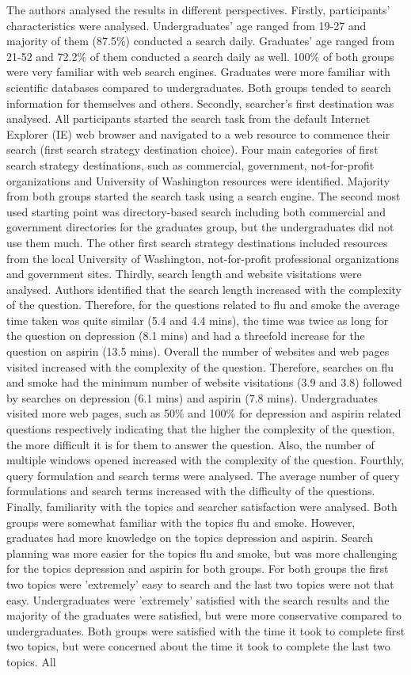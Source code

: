 \documentclass[]{article}
\begin{document}
The authors analysed the results in different perspectives. Firstly, participants' characteristics were analysed. Undergraduates' age ranged from 19-27 and majority of them (87.5\%) conducted a search daily. Graduates' age ranged from 21-52 and 72.2\% of them conducted a search daily as well. 100\% of both groups were very familiar with web search engines. Graduates were more familiar with scientific databases compared to undergraduates. Both groups tended to search information for themselves and others. Secondly, searcher's first destination was analysed. All participants started the search task from the default Internet Explorer (IE) web browser and navigated to a web resource to commence their search (first search strategy destination choice). Four main categories of first search strategy destinations, such as commercial, government, not-for-profit organizations and University of Washington resources were identified. Majority from both groups started the search task using a search engine. The second most used starting point was directory-based search including both commercial and government directories for the graduates group, but the undergraduates did not use them much. The other first search strategy destinations included resources from the local University of Washington, not-for-profit professional organizations and government sites. Thirdly, search length and website visitations were analysed. Authors identified that the search length increased with the complexity of the question. Therefore, for the questions related to flu and smoke the average time taken was quite similar (5.4 and 4.4 mins), the time was twice as long for the question on depression (8.1 mins) and had a threefold increase for the question on aspirin (13.5 mins). Overall the number of websites and web pages visited increased with the complexity of the question. Therefore, searches on flu and smoke had the minimum number of website visitations (3.9 and 3.8) followed by searches on depression (6.1 mins) and aspirin (7.8 mins). Undergraduates visited more web pages, such as 50\% and 100\% for depression and aspirin related questions respectively indicating that the higher the complexity of the question, the more difficult it is for them to answer the question. Also, the number of multiple windows opened increased with the complexity of the question. Fourthly, query formulation and search terms were analysed. The average number of query formulations and search terms increased with the difficulty of the questions. Finally, familiarity with the topics and searcher satisfaction were analysed. Both groups were somewhat familiar with the topics flu and smoke. However, graduates had more knowledge on the topics depression and aspirin. Search planning was more easier for the topics flu and smoke, but was more challenging for the topics depression and aspirin for both groups. For both groups the first two topics were 'extremely' easy to search and the last two topics were not that easy. Undergraduates were 'extremely' satisfied with the search results and the majority of the graduates were satisfied, but were more conservative compared to undergraduates. Both groups were satisfied with the time it took to complete first two topics, but were concerned about the time it took to complete the last two topics. All 
\end{document}
